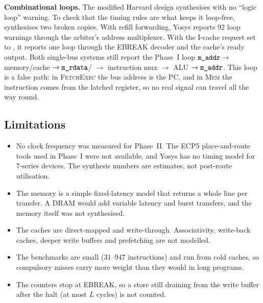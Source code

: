 \textbf{Combinational loops.} The modified Harvard design synthesises with no
``logic loop'' warning. To check that the timing rules are what keeps it loop-free,
 synthesises two broken copies. With refill forwarding,
Yosys reports 92 loop warnings through the arbiter's address multiplexer. With the I-cache
request set to , it reports one loop through the EBREAK decoder and the
cache's ready output. Both single-bus systems still report the Phase~I loop
$\texttt{m\_addr}\rightarrow$ memory/cache $\rightarrow\texttt{m\_rdata}$/
$\rightarrow$ instruction mux $\rightarrow$ ALU $\rightarrow\texttt{m\_addr}$. This loop is a false
path: in \textsc{FetchExec} the bus address is the PC, and in \textsc{Mem} the instruction comes
from the latched register, so no real signal can travel all the way round.

\subsection{Limitations}
\begin{itemize}
  \item No clock frequency was measured for Phase~II. The ECP5 place-and-route tools used in
        Phase~I were not available, and Yosys has no timing model for 7-series devices. The
        synthesis numbers are estimates, not post-route utilisation.
  \item The memory is a simple fixed-latency model that returns a whole line per transfer. A
        DRAM would add variable latency and burst transfers, and the memory itself was not
        synthesised.
  \item The caches are direct-mapped and write-through. Associativity, write-back caches,
        deeper write buffers and prefetching are not modelled.
  \item The benchmarks are small (31--947 instructions) and run from cold caches, so
        compulsory misses carry more weight than they would in long programs.
  \item The counters stop at EBREAK, so a store still draining from the write buffer after the
        halt (at most $L$ cycles) is not counted.
\end{itemize}
